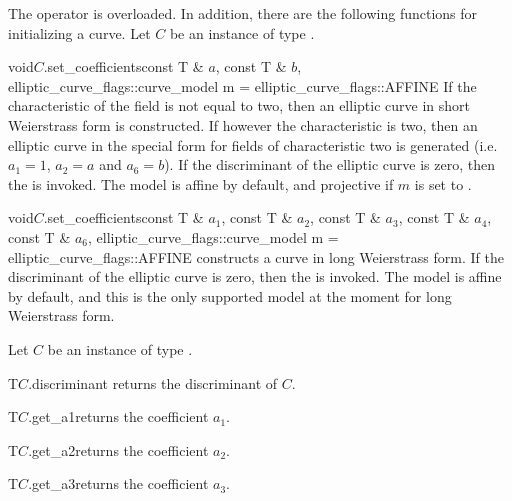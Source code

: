 
\ASGN

The operator \code{=} is overloaded.  In addition, there are the following functions for
initializing a curve.  Let $C$ be an instance of type .

\begin{fcode}{void}{$C$.set_coefficients}{const T & $a$, const T & $b$,
    elliptic_curve_flags::curve_model m = elliptic_curve_flags::AFFINE}%
  If the characteristic of the field is not equal to two, then an elliptic curve in short
  Weierstrass form is constructed.  If however the characteristic is two, then an elliptic curve
  in the special form for fields of characteristic two is generated (i.e. $a_1 = 1$, $a_2 = a$
  and $a_6 = b$).  If the discriminant of the elliptic curve is zero, then the \LEH is invoked.
  The model is affine by default, and projective if $m$ is set to
  .
\end{fcode}

\begin{fcode}{void}{$C$.set_coefficients}{const T & $a_1$,
    const T & $a_2$, const T & $a_3$,
    const T & $a_4$, const T & $a_6$,
    elliptic_curve_flags::curve_model m = elliptic_curve_flags::AFFINE}%
  constructs a curve in long Weierstrass form.  If the discriminant of the elliptic curve is
  zero, then the \LEH is invoked.  The model is affine by default, and this is the only
  supported model at the moment for long Weierstrass form.
\end{fcode}



\ACCS

Let $C$ be an instance of type .

\begin{cfcode}{T}{$C$.discriminant}{}
  returns the discriminant of $C$.
\end{cfcode}

\begin{cfcode}{T}{$C$.get_a1}{}returns the coefficient $a_1$.
\end{cfcode}

\begin{cfcode}{T}{$C$.get_a2}{}returns the coefficient $a_2$.
\end{cfcode}

\begin{cfcode}{T}{$C$.get_a3}{}returns the coefficient $a_3$.
\end{cfcode}

